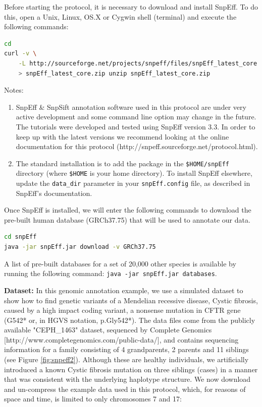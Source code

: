 Before starting the protocol, it is necessary to download and install SnpEff. To do this, open a Unix, Linux, OS.X or Cygwin shell (terminal) and execute the following commands:

\begin{lstlisting}[language=bash]
cd
curl -v \
    -L http://sourceforge.net/projects/snpeff/files/snpEff_latest_core.zip \
    > snpEff_latest_core.zip unzip snpEff_latest_core.zip
\end{lstlisting}

Notes:
\begin{enumerate}

	\item SnpEff \& SnpSift annotation software used in this protocol are under very active development
	and some command line option may change in the future. The tutorials were developed and tested
	using SnpEff version 3.3. In order to keep up with the latest versions we recommend looking at
	the online documentation for this protocol (http://snpeff.sourceforge.net/protocol.html).
	
	\item The standard installation is to add the package in the \texttt{\$HOME/snpEff} directory (where \texttt{\$HOME} is your home directory). To install SnpEff elsewhere, update the \texttt{data\_dir} parameter in your \texttt{snpEff.config} file, as described in SnpEff's documentation.
\end{enumerate}

Once SnpEff is installed, we will enter the following commands to download the pre-built human database (GRCh37.75) that will be used to annotate our data.

\begin{lstlisting}[language=bash]
cd snpEff
java -jar snpEff.jar download -v GRCh37.75
\end{lstlisting}

A list of pre-built databases for a set of 20,000 other species is available by running the following command: \texttt{java -jar snpEff.jar databases}.

\textbf{Dataset:} In this genomic annotation example, we use a simulated dataset to show how to find genetic variants of a Mendelian recessive disease, Cystic fibrosis, caused by a high impact coding variant, a nonsense mutation in CFTR gene (G542* or, in HGVS notation, p.Gly542*). The data files come from the publicly available "CEPH\_1463" dataset, sequenced by Complete Genomics [http://www.completegenomics.com/public-data/], and contains sequencing information for a family consisting of 4 grandparents, 2 parents and 11 siblings (see Figure \ref{fig:snpeff2}). Although these are healthy individuals, we artificially introduced a known Cystic fibrosis mutation on three siblings (cases) in a manner that was consistent with the underlying haplotype structure. We now download and un-compress the example data used in this protocol, which, for reasons of space and time, is limited to only chromosomes 7 and 17:

